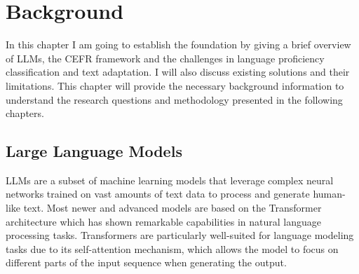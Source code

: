 \chapter{Background}
\label{ch:background}
In this chapter I am going to establish the foundation by giving a brief overview of LLMs, the CEFR framework and the challenges in language proficiency classification and text adaptation. I will also discuss existing solutions and their limitations. This chapter will provide the necessary background information to understand the research questions and methodology presented in the following chapters.

\section{Large Language Models}
\label{s:background_llms}
LLMs are a subset of machine learning models that leverage complex neural networks trained on vast amounts of text data to process and generate human-like text. Most newer and advanced models are based on the Transformer architecture \citep{Vaswani2017} which has shown remarkable capabilities in natural language processing tasks. Transformers are particularly well-suited for language modeling tasks due to its self-attention mechanism, which allows the model to focus on different parts of the input sequence when generating the output.

